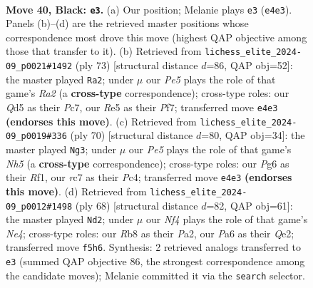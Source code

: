 \documentclass[11pt]{article}
\begin{document}
\clearpage

\begin{figure}[p]\centering
\begin{subfigure}{0.46\textwidth}\centering
\resizebox{\linewidth}{!}{%
\newchessgame
\chessboard[
  setfen={1r6/2RQ4/p2p1kp1/3qrn1p/1p2p2P/8/4NPP1/R4K2 b - - 7 40},
  showmover=false,
  pgfstyle=straightmove, color=movearrow, markmove={e4-e3}
]}
\caption{}
\end{subfigure}\hfill
\begin{subfigure}{0.46\textwidth}\centering
\resizebox{\linewidth}{!}{%
\newchessgame
\chessboard[
  setfen={r5k1/r1p2pn1/1p5q/3P3p/1P1Q1P2/3B4/6RP/4R2K b - - 3 37},
  showmover=false,
  pgfstyle=straightmove, color=movearrow, markmove={a7-a2}
]}
\caption{}
\end{subfigure}
\\[4pt]
\begin{subfigure}{0.46\textwidth}\centering
\resizebox{\linewidth}{!}{%
\newchessgame
\chessboard[
  setfen={2b2rk1/5pp1/1q5r/3P3N/PPP2Q2/8/5PP1/1R3RK1 w - - 1 36},
  showmover=false,
  pgfstyle=straightmove, color=movearrow, markmove={h5-g3}
]}
\caption{}
\end{subfigure}\hfill
\begin{subfigure}{0.46\textwidth}\centering
\resizebox{\linewidth}{!}{%
\newchessgame
\chessboard[
  setfen={6k1/p4p2/2q1rnpp/2p5/4N3/1P2RPP1/P3QK1P/8 w - - 3 35},
  showmover=false,
  pgfstyle=straightmove, color=movearrow, markmove={e4-d2}
]}
\caption{}
\end{subfigure}
\caption{\textbf{Move 40, Black: \texttt{e3}.} (a) Our position; Melanie plays \texttt{e3} (\texttt{e4e3}). Panels (b)--(d) are the retrieved master positions whose correspondence most drove this move (highest QAP objective among those that transfer to it). (b) Retrieved from \texttt{lichess\_elite\_2024-09\_p0021\#1492} (ply 73) [structural distance $d$=86, QAP obj=52]: the master played \texttt{Ra2}; under $\mu$ our \emph{Pe5} plays the role of that game's \emph{Ra2} (a \textbf{cross-type} correspondence); cross-type roles: our \emph{Q}d5 as their \emph{P}c7, our \emph{R}e5 as their \emph{P}f7; transferred move \texttt{e4e3} \textbf{(endorses this move)}. (c) Retrieved from \texttt{lichess\_elite\_2024-09\_p0019\#336} (ply 70) [structural distance $d$=80, QAP obj=34]: the master played \texttt{Ng3}; under $\mu$ our \emph{Pe5} plays the role of that game's \emph{Nh5} (a \textbf{cross-type} correspondence); cross-type roles: our \emph{P}g6 as their \emph{R}f1, our \emph{r}c7 as their \emph{P}c4; transferred move \texttt{e4e3} \textbf{(endorses this move)}. (d) Retrieved from \texttt{lichess\_elite\_2024-09\_p0012\#1498} (ply 68) [structural distance $d$=82, QAP obj=61]: the master played \texttt{Nd2}; under $\mu$ our \emph{Nf4} plays the role of that game's \emph{Ne4}; cross-type roles: our \emph{R}b8 as their \emph{P}a2, our \emph{P}a6 as their \emph{Q}e2; transferred move \texttt{f5h6}. Synthesis: 2 retrieved analogs transferred to \texttt{e3} (summed QAP objective 86, the strongest correspondence among the candidate moves); Melanie committed it via the \texttt{search} selector.}
\label{fig:thought-m79}
\end{figure}
\end{document}
